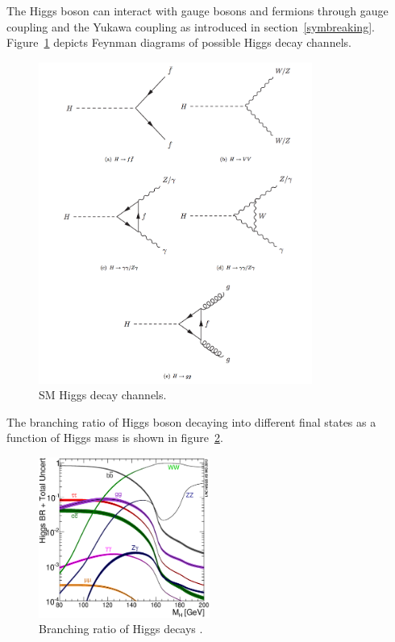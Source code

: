 The Higgs boson can interact with gauge bosons and fermions through gauge coupling and the Yukawa coupling as introduced in section~\ref{symbreaking}.
Figure~\ref{fig:higgs_decay_fd} depicts Feynman diagrams of possible Higgs decay channels.
\begin{figure}[!htb]
  \centering
  \includegraphics[width=0.8\textwidth]{figures/Theory/Figures_Feynman_Hdecay.png}
  \caption{SM Higgs decay channels.}
  \label{fig:higgs_decay_fd}
\end{figure}
The branching ratio of Higgs boson decaying into different final states as a function of Higgs mass is shown in figure~\ref{fig:higgs_decay_br}.
\begin{figure}[!htb]
  \centering
  \includegraphics[width=0.5\textwidth]{figures/Theory/Higgs_BR_LM.eps}
  \caption{Branching ratio of Higgs decays \cite{Heinemeyer:1559921}. }
  \label{fig:higgs_decay_br}
\end{figure} 



